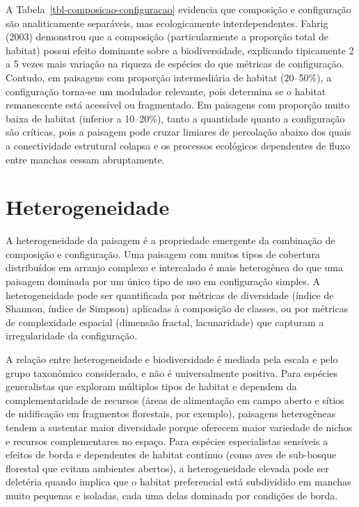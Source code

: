 \documentclass[
  portuguese,
  11pt,
  a4paper,
  open=any]{scrbook}
\begin{document}
A Tabela~\ref{tbl-composicao-configuracao} evidencia que composição e
configuração são analiticamente separáveis, mas ecologicamente
interdependentes. Fahrig (2003) demonstrou que a composição
(particularmente a proporção total de habitat) possui efeito dominante
sobre a biodiversidade, explicando tipicamente 2 a 5 vezes mais variação
na riqueza de espécies do que métricas de configuração. Contudo, em
paisagens com proporção intermediária de habitat (20--50\%), a
configuração torna-se um modulador relevante, pois determina se o
habitat remanescente está acessível ou fragmentado. Em paisagens com
proporção muito baixa de habitat (inferior a 10--20\%), tanto a
quantidade quanto a configuração são críticas, pois a paisagem pode
cruzar limiares de percolação abaixo dos quais a conectividade
estrutural colapsa e os processos ecológicos dependentes de fluxo entre
manchas cessam abruptamente.

\section{Heterogeneidade}\label{heterogeneidade}

A heterogeneidade da paisagem é a propriedade emergente da combinação de
composição e configuração. Uma paisagem com muitos tipos de cobertura
distribuídos em arranjo complexo e intercalado é mais heterogênea do que
uma paisagem dominada por um único tipo de uso em configuração simples.
A heterogeneidade pode ser quantificada por métricas de diversidade
(índice de Shannon, índice de Simpson) aplicadas à composição de
classes, ou por métricas de complexidade espacial (dimensão fractal,
lacunaridade) que capturam a irregularidade da configuração.

A relação entre heterogeneidade e biodiversidade é mediada pela escala e
pelo grupo taxonômico considerado, e não é universalmente positiva. Para
espécies generalistas que exploram múltiplos tipos de habitat e dependem
da complementaridade de recursos (áreas de alimentação em campo aberto e
sítios de nidificação em fragmentos florestais, por exemplo), paisagens
heterogêneas tendem a sustentar maior diversidade porque oferecem maior
variedade de nichos e recursos complementares no espaço. Para espécies
especialistas sensíveis a efeitos de borda e dependentes de habitat
contínuo (como aves de sub-bosque florestal que evitam ambientes
abertos), a heterogeneidade elevada pode ser deletéria quando implica
que o habitat preferencial está subdividido em manchas muito pequenas e
isoladas, cada uma delas dominada por condições de borda.
\end{document}

